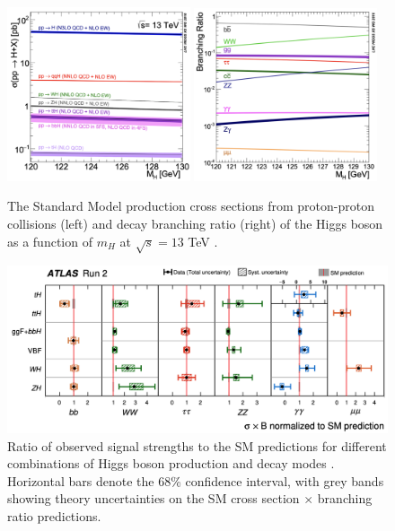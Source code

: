\begin{figure}[h!]
    \center
    \includegraphics[width=0.48\textwidth]{Images/Theory/prodHiggs.png}
    \includegraphics[width=0.48\textwidth]{Images/Theory/decayHiggs.png}
    \caption{The Standard Model production cross sections from proton-proton collisions (left) and decay branching ratio (right) of the Higgs boson as a function of $m_H$ at $\sqrt{s} = 13$ TeV \cite{LHCHiggsCrossSectionWorkingGroup:2016ypw}.}
    \label{fig:prodHcross}
\end{figure}
\begin{figure}[h!]
    \hspace{-0.48cm}
    \includegraphics[width=\textwidth]{Images/Theory/allMesRun2.png}
    \caption{Ratio of observed signal strengths to the SM predictions for different combinations of Higgs boson production and decay modes \cite{ATLAS:2022vkf}. Horizontal bars denote the 68\% confidence interval, with grey bands showing theory uncertainties on the SM cross section $\times$ branching ratio predictions.}
    \label{fig:measprodH}
\end{figure}

